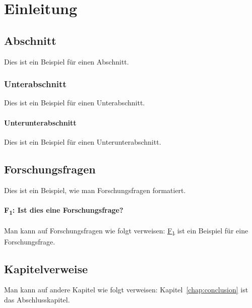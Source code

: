 \chapter{Einleitung}
\label{chap:introduction}

\section{Abschnitt}

Dies ist ein Beispiel für einen Abschnitt.

\subsection{Unterabschnitt}

Dies ist ein Beispiel für einen Unterabschnitt.

\subsubsection{Unterunterabschnitt}

Dies ist ein Beispiel für einen Unterunterabschnitt.

\section{Forschungsfragen}

Dies ist ein Beispiel, wie man Forschungsfragen formatiert.

\hypertarget{rq:1}{
    \subsubsection{F\textsubscript{1}: Ist dies eine Forschungsfrage?}
}

Man kann auf Forschungsfragen wie folgt verweisen: \hyperlink{rq:1}{F\textsubscript{1}} ist ein Beispiel für eine Forschungsfrage.

\section{Kapitelverweise}

Man kann auf andere Kapitel wie folgt verweisen: Kapitel~\ref{chap:conclusion} ist das Abschlusskapitel.
